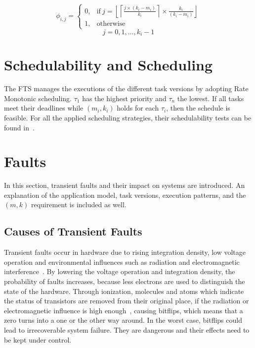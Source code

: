 \[
\phi_{i,j} = 
  \begin{cases} 
   0, & \text{if}~j= \left \lfloor \left \lceil \frac{j\times(k_i - m_i)}{k_i} \right \rceil \times \frac{k_i}{(k_i - m_i)} \right \rfloor \\
   1, & \text{otherwise} 
  \end{cases}
\]
\vspace{-0.3cm}
\[
j=0,1,\dots,k_i - 1
\]


\section{Schedulability and Scheduling}

The FTS manages the executions of the different task versions by adopting Rate Monotonic scheduling. $\tau_1$ has the highest priority and $\tau_n$ the lowest. If all tasks meet their deadlines while $(m_i,k_i)$ holds for each $\tau_i$, then the schedule is feasible. For all the applied scheduling strategies,
their  schedulability  tests  can  be  found in~\cite{Chen2016}.

\section{Faults}
In this section, transient faults and their impact on systems are introduced. An explanation of the application model, task versions, execution patterns, and the $(m,k)$ requirement is included as well.
\subsection{Causes of Transient Faults} 
Transient faults occur in hardware due to rising integration density, low voltage operation and environmental influences such as radiation and electromagnetic interference~\cite{1545891}. By lowering the voltage operation and integration density, the probability of faults increases, because less electrons are used to distinguish the state of the hardware. Through ionization, molecules and atoms which indicate the status of transistors are removed from their original place, if the radiation or electromagnetic influence is high enough~\cite{1545891}, causing bitflips, which means that a zero turns into a one or the other way around. In the worst case, bitflips could lead to irrecoverable system failure. They are dangerous and their effects need to be kept under control. 

